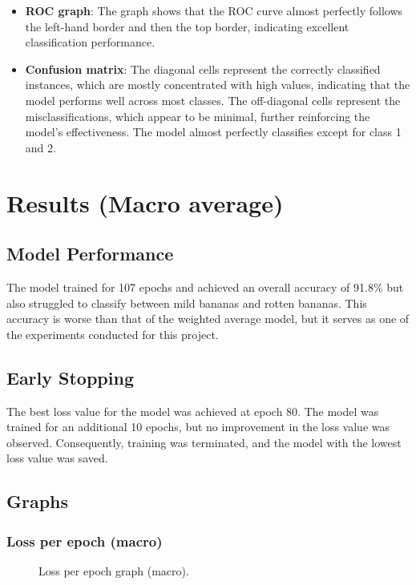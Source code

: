 \documentclass[a4paper,oneside,11pt]{book}
\begin{document}
\begin{itemize}
    \item \textbf{ROC graph}: The graph shows that the ROC curve almost perfectly follows the left-hand border and then the top border, indicating excellent classification performance.
    \item \textbf{Confusion matrix}: The diagonal cells represent the correctly classified instances, which are mostly concentrated with high values, indicating that the model performs well across most classes. The off-diagonal cells represent the misclassifications, which appear to be minimal, further reinforcing the model's effectiveness. The model almost perfectly classifies except for class 1 and 2.
\end{itemize}
\chapter{Results (Macro average)}
\section{Model Performance}
The model trained for 107 epochs and achieved an overall accuracy of 91.8\% but also struggled to classify between mild bananas and rotten bananas. This accuracy is worse than that of the weighted average model, but it serves as one of the experiments conducted for this project.
\section{Early Stopping}
The best loss value for the model was achieved at epoch 80. The model was trained for an additional 10 epochs, but no improvement in the loss value was observed. Consequently, training was terminated, and the model with the lowest loss value was saved.
\section{Graphs}
\subsection{Loss per epoch (macro)}
\begin{figure}[H]
    \centering
    \caption{Loss per epoch graph (macro).}
\end{figure}
\end{document}
